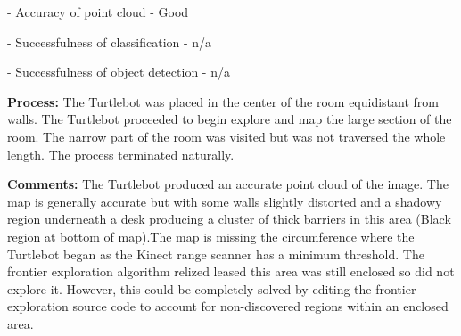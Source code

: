 \documentclass{mproj}
\begin{document}
- Accuracy of point cloud - Good

- Successfulness of classification - n/a

- Successfulness of object detection - n/a


\textbf{Process:} The Turtlebot was placed in the center of the room equidistant from walls. The Turtlebot proceeded to begin explore and map the large section of the room. The narrow part of the room was visited but was not traversed the whole length. The process terminated naturally.

\textbf{Comments:} The Turtlebot produced an accurate point cloud of the image. The  map is generally accurate but with some walls slightly distorted and a shadowy region underneath a desk producing a cluster of thick barriers in this area (Black region at bottom of map).The map is missing the circumference where the Turtlebot began as the Kinect range scanner has a minimum threshold. The frontier exploration algorithm relized leased this area was still enclosed so did not explore it. However, this could be completely solved by editing the frontier exploration source code to account for non-discovered regions within an enclosed area. 
\end{document}

